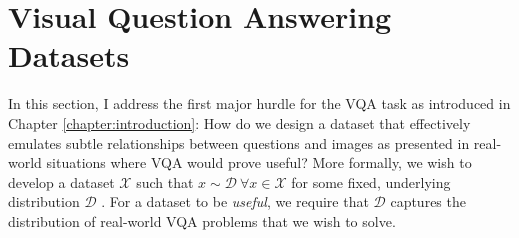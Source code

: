 \section{Visual Question Answering Datasets}
\label{section:vqa_datasets}

In this section, I address the first major hurdle for the VQA task as introduced in Chapter \ref{chapter:introduction}: How do we design a dataset that effectively emulates subtle relationships between questions and images as presented in real-world situations where VQA would prove useful? More formally, we wish to develop a dataset \(\mathcal{X}\) such that \(x \sim \mathcal{D}\ \forall x \in \mathcal{X}\) for some fixed, underlying distribution \(\mathcal{D}\) \cite{mohri2018foundations}. For a dataset to be \textit{useful}, we require that \(\mathcal{D}\) captures the distribution of real-world VQA problems that we wish to solve.



